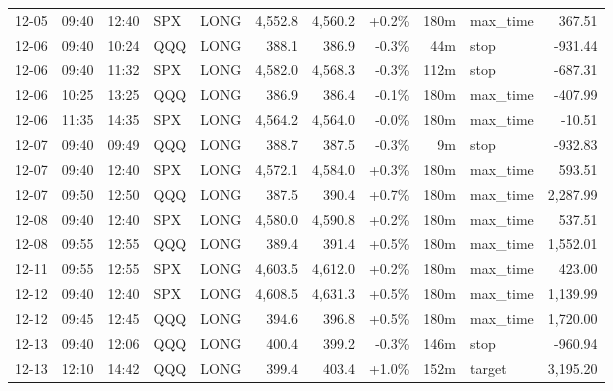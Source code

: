 \documentclass[11pt,a4paper,twoside]{article}
\begin{document}
\begin{center}
\begin{longtable}{>{\color{txtmain}}l l l l l r r r r >{\color{txtmain}}l r}
12-05 & 09:40 & 12:40 & SPX & LONG & 4,552.8 & 4,560.2 & \textcolor{wingreen}{+0.2\%} & 180m & max\_time & \textcolor{wingreen}{367.51} \\
12-06 & 09:40 & 10:24 & QQQ & LONG & 388.1 & 386.9 & \textcolor{lossred}{-0.3\%} & 44m & stop & \textcolor{lossred}{-931.44} \\
12-06 & 09:40 & 11:32 & SPX & LONG & 4,582.0 & 4,568.3 & \textcolor{lossred}{-0.3\%} & 112m & stop & \textcolor{lossred}{-687.31} \\
12-06 & 10:25 & 13:25 & QQQ & LONG & 386.9 & 386.4 & \textcolor{lossred}{-0.1\%} & 180m & max\_time & \textcolor{lossred}{-407.99} \\
12-06 & 11:35 & 14:35 & SPX & LONG & 4,564.2 & 4,564.0 & \textcolor{lossred}{-0.0\%} & 180m & max\_time & \textcolor{lossred}{-10.51} \\
12-07 & 09:40 & 09:49 & QQQ & LONG & 388.7 & 387.5 & \textcolor{lossred}{-0.3\%} & 9m & stop & \textcolor{lossred}{-932.83} \\
12-07 & 09:40 & 12:40 & SPX & LONG & 4,572.1 & 4,584.0 & \textcolor{wingreen}{+0.3\%} & 180m & max\_time & \textcolor{wingreen}{593.51} \\
12-07 & 09:50 & 12:50 & QQQ & LONG & 387.5 & 390.4 & \textcolor{wingreen}{+0.7\%} & 180m & max\_time & \textcolor{wingreen}{2,287.99} \\
12-08 & 09:40 & 12:40 & SPX & LONG & 4,580.0 & 4,590.8 & \textcolor{wingreen}{+0.2\%} & 180m & max\_time & \textcolor{wingreen}{537.51} \\
12-08 & 09:55 & 12:55 & QQQ & LONG & 389.4 & 391.4 & \textcolor{wingreen}{+0.5\%} & 180m & max\_time & \textcolor{wingreen}{1,552.01} \\
12-11 & 09:55 & 12:55 & SPX & LONG & 4,603.5 & 4,612.0 & \textcolor{wingreen}{+0.2\%} & 180m & max\_time & \textcolor{wingreen}{423.00} \\
12-12 & 09:40 & 12:40 & SPX & LONG & 4,608.5 & 4,631.3 & \textcolor{wingreen}{+0.5\%} & 180m & max\_time & \textcolor{wingreen}{1,139.99} \\
12-12 & 09:45 & 12:45 & QQQ & LONG & 394.6 & 396.8 & \textcolor{wingreen}{+0.5\%} & 180m & max\_time & \textcolor{wingreen}{1,720.00} \\
12-13 & 09:40 & 12:06 & QQQ & LONG & 400.4 & 399.2 & \textcolor{lossred}{-0.3\%} & 146m & stop & \textcolor{lossred}{-960.94} \\
12-13 & 12:10 & 14:42 & QQQ & LONG & 399.4 & 403.4 & \textcolor{wingreen}{+1.0\%} & 152m & target & \textcolor{wingreen}{3,195.20} \\

\end{longtable}
\end{center}
\end{document}
